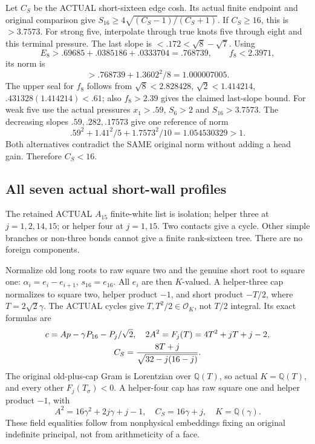 Let \(C_S\) be the ACTUAL short-sixteen edge cosh.
Its actual finite endpoint and original comparison give
\(S_{16}\ge4\sqrt{(C_S-1)/(C_S+1)}\).
If \(C_S\ge16\), this is \(>3.7573\).
For strong five, interpolate through true knots
five through eight and this terminal pressure.
The last slope is \(<.172<\sqrt8-\sqrt7\).
Using
\[
 E_8>.69685+.0385186+.0333704=.768739,\qquad f_8<2.3971,
\]
its norm is
\[
                      >.768739+1.3602^2/8=1.000007005 .
\]
The upper seal for \(f_8\) follows from
\(\sqrt8<2.828428\), \(\sqrt2<1.414214\),
\(.431328(1.414214)<.61\); also \(f_8>2.39\)
gives the claimed last-slope bound.
For weak five use the actual pressures
\(x_1>.59\), \(S_6>2\) and \(S_{16}>3.7573\).
The decreasing slopes \(.59,.282,.17573\) give
one reference of norm
\[
                     .59^2+1.41^2/5+1.7573^2/10
                            =1.054530329>1 .
\]
Both alternatives contradict the SAME original
norm without adding a head gain.
Therefore \(C_S<16\).

\subsection{All seven actual short-wall profiles}
\label{app:arithB16shortwhite}

The retained ACTUAL \(A_{15}\) finite-white list is
isolation; helper three at \(j=1,2,14,15\);
or helper four at \(j=1,15\).
Two contacts give a cycle.
Other simple branches or non-three bonds cannot
give a finite rank-sixteen tree.
There are no foreign components.

Normalize old long roots to raw square two and
the genuine short root to square one:
\(\alpha_i=e_i-e_{i+1}\), \(s_{16}=e_{16}\).
All \(e_i\) are then \(K\)-valued.
A helper-three cap normalizes to square two,
helper product \(-1\), and short product \(-T/2\),
where \(T=2\sqrt2\gamma\).
The ACTUAL cycles give
\(T,T^2/2\in\mathcal O_K\), not \(T/2\) integral.
Its exact formulas are
\[
 \begin{gathered}
 c=Ap-\gamma P_{16}-P_j/\sqrt2,\quad
 2A^2=F_j(T)=4T^2+jT+j-2,\\
 C_S={8T+j\over\sqrt{32-j(16-j)}} .
 \end{gathered}
\]
The original old-plus-cap Gram is Lorentzian over
\(\mathbb Q(T)\), so actual \(K=\mathbb Q(T)\),
and every other \(F_j(T_\sigma)<0\).
A helper-four cap has raw square one and helper
product \(-1\), with
\[
       A^2=16\gamma^2+2j\gamma+j-1,\quad
       C_S=16\gamma+j,\quad K=\mathbb Q(\gamma).
\]
These field equalities follow from nonphysical
embeddings fixing an original indefinite principal,
not from arithmeticity of a face.


